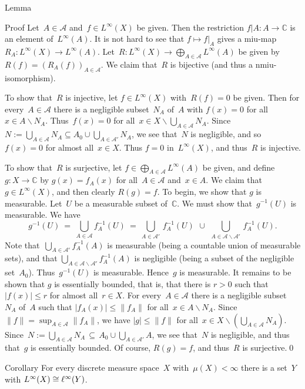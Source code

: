 \documentclass[a]{subfiles}
\begin{document}
\begin{parsec}
\begin{point}{Lemma}
\begin{point}{Proof}
Let~$A\in \mathcal{A}$
and~$f \in L^\infty(X)$ be given.
Then the restriction $f|A\colon A\to \mathbb{C}$
is an element of~$L^\infty(A)$.
It is not hard to see that $f\mapsto f|_A$
gives a miu-map
$R_A\colon L^\infty(X)\to L^\infty(A)$.
Let~$R\colon L^\infty(X)\to \bigoplus_{A\in \mathcal{A}} L^\infty(A)$
be given by $R(f) = (R_A(f))_{A\in \mathcal{A}}$.
We claim that~$R$ is bijective (and thus a nmiu-isomorphism).

To show that~$R$ is injective,
let $f\in L^\infty(X)$ with~$R(f)=0$ be given.
Then for every~$A\in \mathcal{A}$
there is a negligible subset~$N_A$ of~$A$ with $f(x)=0$
for all~$x\in A\backslash N_A$.
Thus~$f(x)=0$ for all~$x\in X\backslash\bigcup_{A\in \mathcal{A}} N_A$.
Since~$N := \bigcup_{A\in\mathcal{A}} N_A 
\subseteq A_0 \cup \bigcup_{A\in\mathcal{A}'} N_A$,
we see that~$N$ is negligible,
and so~$f(x)=0$ for almost all~$x\in X$.
Thus $f=0$ in~$L^\infty(X)$,
and thus~$R$ is injective.

To show that~$R$ is surjective,
let $f\in \bigoplus_{A\in \mathcal{A}} L^\infty(A)$
be given,
and define~$g\colon X\to \mathbb{C}$
by $g(x)=f_A(x)$
for all~$A\in\mathcal{A}$ and~$x\in A$.
We claim that~$g\in L^\infty(X)$,
and then clearly $R(g)=f$.
To begin, we show that $g$ is measurable.
Let~$U$ be a measurable subset of~$\mathbb{C}$.
We must show that~$g^{-1}(U)$ is measurable.
We have
\begin{equation*}
\textstyle 
g^{-1}(U)\ = \ \bigcup_{A\in \mathcal{A}} f^{-1}_A(U)
\ = \ \bigcup_{A\in \mathcal{A}'} \, f^{-1}_A(U)
\ \,\cup\ \,\bigcup_{A\in \mathcal{A}\backslash \mathcal{A}'}\, f^{-1}_A(U).
\end{equation*}
Note that~$\bigcup_{A\in\mathcal{A}'}f_A^{-1}(A)$
is measurable
(being a countable union of measurable sets),
and that $\bigcup_{A\in\mathcal{A}\backslash\mathcal{A}'} f_A^{-1}(A)$
is negligible
(being a subset of the negligible set~$A_0$).
Thus~$g^{-1}(U)$ is measurable.
Hence~$g$ is measurable.
It remains to be shown
that $g$ is essentially bounded,
that is, that there is $r>0$ such that $|f(x)|\leq r$
for almost all~$r\in X$.
For every~$A\in\mathcal{A}$
there is a negligible
subset~$N_A$ of~$A$
such that $|f_A(x)|\leq \|f_A\|$
for all~$x\in A\backslash N_A$.
Since~$\|f\|=\sup_{A\in\mathcal{A}}\|f_A\|$,
we have $|g|\leq \|f\|$
for all~$x\in X\backslash (\bigcup_{A\in\mathcal{A}}N_A)$.
Since~$N:=\bigcup_{A\in\mathcal{A}}N_A\,\subseteq\,
A_0\cup\bigcup_{A\in\mathcal{A}'}A$,
we see that~$N$ is negligible,
and thus that~$g$ is essentially bounded.
Of course, $R(g)=f$, and thus~$R$ is surjective.\qed
\end{point}
\end{point}

\begin{point}{Corollary}%
For every discrete 
measure space~$X$ with~$\mu(X)<\infty$
there is a  set~$Y$ with $L^\infty(X)\cong \ell^\infty(Y)$.
\end{point}
\end{parsec}
\end{document}

